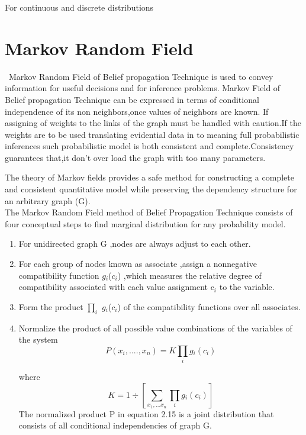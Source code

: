 For continuous and discrete distributions


\section{Markov  Random Field}
\ Markov  Random Field of Belief propagation Technique is used to convey information for useful decisions and for  inference problems.
 Markov  Field of Belief propagation Technique can be expressed in terms of conditional independence of its non neighbors,once values of neighbors  are known.
 If assigning of weights to the links of the graph must be handled with caution.If the weights are to be used translating evidential data in to meaning full probabilistic inferences such probabilistic model is both consistent and complete.Consistency guarantees that,it don't over load the graph with too many parameters.


The theory of Markov fields provides a safe method for constructing a complete and consistent quantitative model while preserving the dependency structure for an arbitrary graph (G).\\
The Markov Random Field method of  Belief Propagation Technique consists of four conceptual steps to find marginal distribution for any probability model.


\begin{enumerate}
  \item For unidirected graph G ,nodes are always adjust to each other.
\item For each group of nodes known as associate ,assign a nonnegative compatibility function $g{_i}$($c{_i}$) ,which measures the relative degree of compatibility associated with each value assignment c${_i}$ to the variable.
\item Form the product $\prod_i$ $g{_i}$($c{_i}$) of the compatibility functions over all associates.

\item Normalize the product of all possible value combinations of the variables of the system
\begin{equation}\label{}
    P( x{_i},....,x{_n}) =K\prod_{i}g{_i}(c{_i})
\end{equation}

where
 \begin{equation}\label{}
    K= 1\div[\sum_{x{_1},...x{_n}}\prod_{i}g{_i}(c{_i})]
 \end{equation}
The normalized product P in equation 2.15 is a joint distribution that consists of all conditional independencies of graph G.
\end{enumerate}




